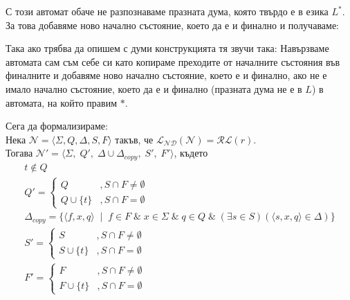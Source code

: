 \documentclass[12pt]{article}
\begin{document}
С този автомат обаче не разпознаваме празната дума, която твърдо е в езика \(L^*\).
За това добавяме ново начално състояние, което да е и финално и получаваме:

\begin{center}
\end{center}

Така ако трябва да опишем с думи конструкцията тя звучи така:
Навързваме автомата сам съм себе си като копираме преходите от началните състояния във финалните
и добавяме ново начално състояние, което е и финално, ако не е имало начално състояние, което да е и финално (празната дума не е в \(L\))
в автомата, на който правим \(*\). \\\par
Сега да формализираме: \\
Нека \(\mathcal{N} = \langle \Sigma, Q, \Delta, S, F \rangle\) такъв, че \(\mathcal{L_{ND}}(\mathcal{N}) = \mathcal{RL}(r)\). \\
Тогава \(\mathcal{N}' = \langle \Sigma, \; Q', \; \Delta \cup \Delta_{copy}, \; S', \; F' \rangle\), където
\begin{align*}
    t \notin Q \\
    Q' = \begin{cases}
    	Q &, S \cap F \neq \emptyset \\
        Q \cup \{t\} &, S \cap F = \emptyset
    \end{cases} \\
    \Delta_{copy} = \{ \langle f, x, q \rangle \; \mid \; f \in F \; \& \; x \in \Sigma \; \& \; q \in Q \; \& \; (\exists s \in S)(\langle s, x, q \rangle \in \Delta)\} \\
    S' = \begin{cases}
    	S &, S \cap F \neq \emptyset \\
        S \cup \{t\} &, S \cap F = \emptyset
    \end{cases} \\
    F' = \begin{cases}
    	F &, S \cap F \neq \emptyset \\
        F \cup \{t\} &, S \cap F = \emptyset
    \end{cases}
\end{align*}
\end{document}
